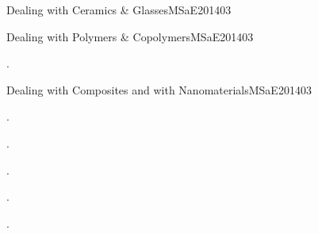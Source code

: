 \begin{syllabus}
\begin{unit}{Dealing with Ceramics \& Glasses}{}{MSaE2014}{0}{3}
\begin{unit}{Dealing with Polymers \& Copolymers}{}{MSaE2014}{0}{3}
\begin{learningoutcomes}
      \item . %
   \end{learningoutcomes}
\end{unit}

\begin{unit}{Dealing with Composites and with Nanomaterials}{}{MSaE2014}{0}{3}
\begin{topics}
      \item . %
      \item . %
      \item . %
      \item . %
\end{topics}
   \begin{learningoutcomes}
      \item . %
   \end{learningoutcomes}
\end{unit}


\end{unit}
\end{syllabus}
